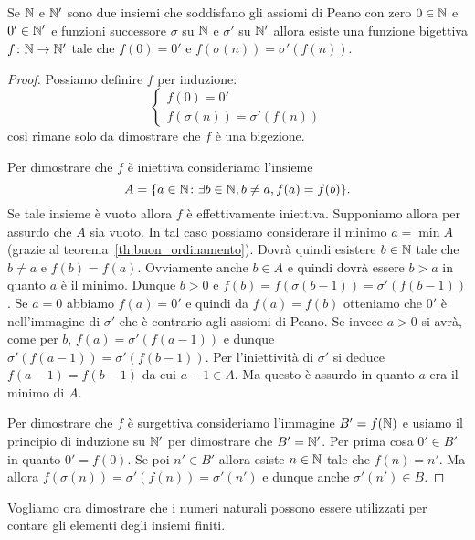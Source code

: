 \begin{theorem}
  Se $\mathbb N$ e $\mathbb N'$ sono due insiemi che soddisfano gli assiomi di Peano 
  con zero $0\in \mathbb N$ e $0'\in \mathbb N'$ e funzioni 
  successore $\sigma$ su $\mathbb N$ e $\sigma'$ su $\mathbb N'$ allora
  esiste una funzione bigettiva $f\colon \mathbb N\to \mathbb N'$ tale che 
  $f(0) = 0'$ e $f(\sigma(n)) = \sigma'(f(n))$.
\end{theorem}
%
\begin{proof}
Possiamo definire $f$ per induzione:
\[
\begin{cases}
  f(0) = 0' \\ 
  f(\sigma(n)) = \sigma'(f(n))
\end{cases}  
\]
così rimane solo da dimostrare che $f$ è una bigezione.

Per dimostrare che $f$ è iniettiva consideriamo l'insieme 
\[
  A={\left\{ a\in \mathbb N\colon \exists b\in \mathbb N, b\neq a, f(a)=f(b) \right\}}.
\]
Se tale insieme è vuoto allora $f$ è effettivamente iniettiva.
Supponiamo allora per assurdo che $A$ sia vuoto.
In tal caso possiamo considerare il minimo $a=\min A$ 
(grazie al teorema~\ref{th:buon_ordinamento}).
Dovrà quindi esistere $b\in \mathbb N$ tale che $b\neq a$ e $f(b)=f(a)$.
Ovviamente anche $b\in A$ e quindi dovrà essere $b>a$ in quanto
$a$ è il minimo. Dunque $b>0$ e $f(b) = f(\sigma(b-1))
=\sigma'(f(b-1))$. Se $a=0$ abbiamo $f(a)=0'$ e quindi da $f(a)=f(b)$ 
otteniamo che $0'$ è nell'immagine di $\sigma'$ che è contrario 
agli assiomi di Peano. 
Se invece $a>0$ si avrà, come per $b$,
$f(a)=\sigma'(f(a-1))$ e dunque $\sigma'(f(a-1)) = \sigma'(f(b-1))$.
Per l'iniettività di $\sigma'$ si deduce $f(a-1)=f(b-1)$ da cui 
$a-1 \in A$. Ma questo è assurdo in quanto $a$ era il minimo di $A$.

Per dimostrare che $f$ è surgettiva consideriamo l'immagine 
$B'=f(\mathbb N)$ e usiamo il principio di induzione su $\mathbb N'$ 
per dimostrare che $B'=\mathbb N'$.
Per prima cosa $0'\in B'$ in quanto $0'=f(0)$.
Se poi $n'\in B'$ allora esiste $n\in \mathbb N$ tale che $f(n)=n'$.
Ma allora $f(\sigma(n))=\sigma'(f(n))=\sigma'(n')$ 
e dunque anche $\sigma'(n')\in B$. 
\end{proof}

Vogliamo ora dimostrare che i numeri naturali possono essere utilizzati 
per contare gli elementi degli insiemi finiti.

